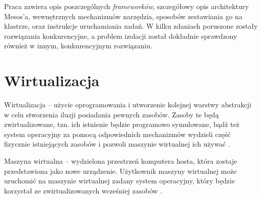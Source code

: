 \documentclass[10pt,a4paper,titlepage,twoside]{report}
\begin{document}
Praca zawiera opis poszczególnych \textit{frameworków}, szczegółowy opis architektury Mesos’a, wewnętrznych mechanizmów narzędzia, sposobów zestawiania go na klastrze, oraz instrukcje uruchamiania zadań. W kilku zdaniach poruszone zostały rozwiązania konkurencyjne, a problem izolacji został dokładnie sprawdzony również w innym, konkurencyjnym rozwiązaniu.

\section{Wirtualizacja}
\indent \indent Wirtualizacja – użycie oprogramowania i utworzenie kolejnej warstwy abstrakcji w celu stworzenia iluzji posiadania pewnych zasobów. Zasoby te będą zwirtualizowane, tzn. ich istnienie będzie programowo symulowane, bądź też system operacyjny za pomocą odpowiednich mechanizmów wydzieli część fizycznie istniejących zasobów i pozwoli maszynie wirtualnej ich używać \cite{ad15}.

Maszyna wirtualna – wydzielona przestrzeń komputera hosta, która zostaje przedstawiona jako nowe urządzenie. Użytkownik maszyny wirtualnej może uruchomić na maszynie wirtualnej zadany system operacyjny, który będzie korzystał ze zwirtualizowanych wcześniej zasobów \cite{ad15}.
\end{document}
